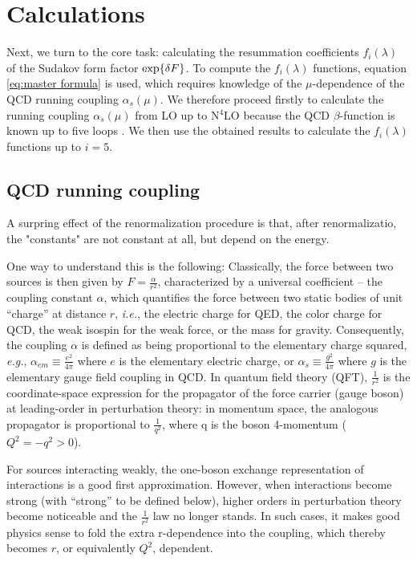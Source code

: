 \documentclass[../main.tex]{subfiles}
\begin{document}
\chapter{Calculations}\label{ch:calculations}

Next, we turn to the core task: calculating the resummation coefficients $f_i(\lambda)$ of the
Sudakov form factor $\exp{\var{F}}$. To compute the $f_i(\lambda)$ functions, equation \cref{eq:master formula} is used, which
requires knowledge of the $\mu$-dependence of the QCD running coupling $\alpha_s(\mu)$.
We therefore proceed firstly to calculate the running coupling $\alpha_s(\mu)$ from LO up to N$^4$LO because the QCD $\beta$-function is known up to five loops \cite{Herzog_2017}. 
We then use the obtained results to calculate the $f_i(\lambda)$ functions up to $i = 5$.

\section{QCD running coupling} \label{sec:QCD_running_coupling}

A surpring effect of the renormalization procedure is that, after renormalizatio, the "constants" are not constant
at all, but depend on the energy.

One way to understand this is the following: Classically, the force between two sources is then given by $F = \frac{\alpha}{r^2}$, 
characterized by a universal coefficient -- the coupling constant $\alpha$, which 
quantifies the force between two static bodies of unit “charge” at distance $r$,
\textit{i.e.}, the electric charge for QED, the color charge for QCD, the weak isospin
for the weak force, or the mass for gravity. Consequently, the coupling $\alpha$ is defined
as being proportional to the elementary charge squared, \textit{e.g.}, $\alpha_{em} \equiv \frac{e^2}{4\pi}$ where 
$e$ is the elementary electric charge, or $\alpha_s \equiv \frac{g^2}{4\pi}$ where $g$ is the elementary gauge field
coupling in QCD.
In quantum field theory (QFT), $\frac{1}{r^2}$ is the coordinate-space expression
for the propagator of the force carrier (gauge boson) at leading-order in perturbation
theory: in momentum space, the analogous propagator is proportional to $\frac{1}{q^2}$, where q is
the boson 4-momentum ($Q^2=-q^2>0$).

For sources interacting weakly, the one-boson exchange representation of interactions
is a good first approximation. However, when interactions become strong (with “strong”
to be defined below), higher orders in perturbation theory become noticeable and the
$\frac{1}{r^2}$ law no longer stands. In such cases, it makes good physics sense to fold the extra r-dependence
into the coupling, which thereby becomes $r$, or equivalently $Q^2$, dependent.
\end{document}
